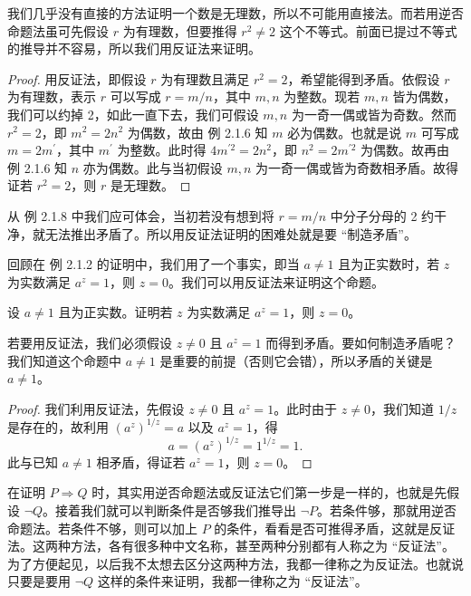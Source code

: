 我们几乎没有直接的方法证明一个数是无理数，所以不可能用直接法。而若用逆否命题法虽可先假设 $r$ 为有理数，但要推得 $r^{2} \neq 2$ 这个不等式。前面已提过不等式的推导并不容易，所以我们用反证法来证明。

\begin{proof}
用反证法，即假设 $r$ 为有理数且满足 $r^{2} = 2$，希望能得到矛盾。依假设 $r$ 为有理数，表示 $r$ 可以写成 $r = m / n$，其中 $m, n$ 为整数。现若 $m, n$ 皆为偶数，我们可以约掉 2，如此一直下去，我们可假设 $m, n$ 为一奇一偶或皆为奇数。然而 $r^{2} = 2$，即 $m^{2} = 2n^{2}$ 为偶数，故由 例 2.1.6 知 $m$ 必为偶数。也就是说 $m$ 可写成 $m = 2m^{\prime}$，其中 $m^{\prime}$ 为整数。此时得 $4m^{\prime 2} = 2n^{2}$，即 $n^{2} = 2m^{\prime 2}$ 为偶数。故再由 例 2.1.6 知 $n$ 亦为偶数。此与当初假设 $m, n$ 为一奇一偶或皆为奇数相矛盾。故得证若 $r^{2} = 2$，则 $r$ 是无理数。
\end{proof}

从 例 2.1.8 中我们应可体会，当初若没有想到将 $r = m / n$ 中分子分母的 2 约干净，就无法推出矛盾了。所以用反证法证明的困难处就是要 “制造矛盾”。

回顾在 例 2.1.2 的证明中，我们用了一个事实，即当 $a \neq 1$ 且为正实数时，若 $z$ 为实数满足 $a^{z} = 1$，则 $z = 0$。我们可以用反证法来证明这个命题。

\begin{example}
设 $a \neq 1$ 且为正实数。证明若 $z$ 为实数满足 $a^{z} = 1$，则 $z = 0$。
\end{example}

若要用反证法，我们必须假设 $z \neq 0$ 且 $a^{z} = 1$ 而得到矛盾。要如何制造矛盾呢？我们知道这个命题中 $a \neq 1$ 是重要的前提（否则它会错），所以矛盾的关键是 $a \neq 1$。

\begin{proof}
我们利用反证法，先假设 $z \neq 0$ 且 $a^{z} = 1$。此时由于 $z \neq 0$，我们知道 $1 / z$ 是存在的，故利用 $(a^{z})^{1 / z} = a$ 以及 $a^{z} = 1$，得
$$a = (a^{z})^{1 / z} = 1^{1 / z} = 1.$$
此与已知 $a \neq 1$ 相矛盾，得证若 $a^{z} = 1$，则 $z = 0$。
\end{proof}

\begin{remark}
在证明 $P \Rightarrow Q$ 时，其实用逆否命题法或反证法它们第一步是一样的，也就是先假设 $\neg Q$。接着我们就可以判断条件是否够我们推导出 $\neg P$。若条件够，那就用逆否命题法。若条件不够，则可以加上 $P$ 的条件，看看是否可推得矛盾，这就是反证法。这两种方法，各有很多种中文名称，甚至两种分别都有人称之为 “反证法”。为了方便起见，以后我不太想去区分这两种方法，我都一律称之为反证法。也就说只要是要用 $\neg Q$ 这样的条件来证明，我都一律称之为 “反证法”。
\end{remark}

